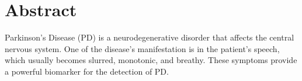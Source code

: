 \chapter*{Abstract}
\thispagestyle{empty}



Parkinson’s Disease (PD) is a neurodegenerative disorder that affects the central nervous system. One of the disease's manifestation is in the patient’s speech, which usually becomes slurred, monotonic, and breathy. These symptoms provide a powerful biomarker for the detection of PD.

